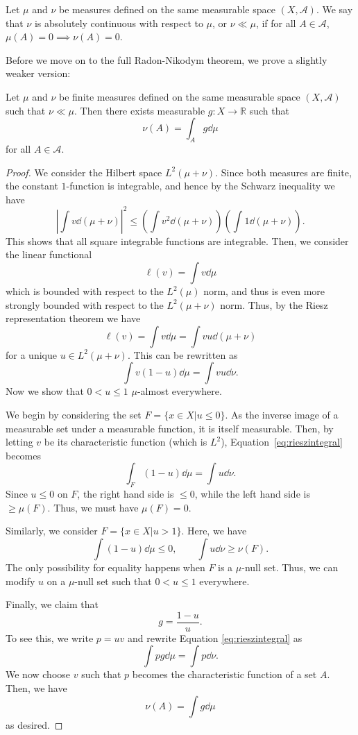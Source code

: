 \documentclass[twoside,symmetric, openany, 12pt]{./tuftebook}
\theoremstyle{definition}
\theoremstyle{definition}
\theoremstyle{definition}
\newcommand{\R}{\mathbb{R}}
\begin{document}
\begin{Definition}
	Let $\mu$ and $\nu$ be measures defined on the same measurable space $(X, \mathcal{A})$. We say that $\nu$ is absolutely continuous with respect to $\mu$, or $\nu \ll \mu$, if for all $A\in \mathcal{A}$, $\mu(A)=0\implies \nu(A)=0$.
\end{Definition}

Before we move on to the full Radon-Nikodym theorem, we prove a slightly weaker version:
\begin{Theorem}
	Let $\mu$ and $\nu$ be finite measures defined on the same measurable space $(X, \mathcal{A})$ such that $\nu \ll \mu$. Then there exists measurable $g:X \to \R$ such that
	\[\nu(A) = \int_A g \dd{\mu}\]
	for all $A\in \mathcal{A}$.
\end{Theorem}
\begin{proof}
	We consider the Hilbert space $L^2(\mu+\nu)$. Since both measures are finite, the constant $1$-function is integrable, and hence by the Schwarz inequality we have
	\[\left|\int v \dd{(\mu+\nu)}\right|^2 \le \left(\int v^2 \dd{(\mu+\nu)}\right) \left(\int 1\dd{(\mu+\nu)}\right).\]
	This shows that all square integrable functions are integrable. Then, we consider the linear functional
	\[\ell(v) = \int v \dd{\mu}\]
	which is bounded with respect to the $L^2(\mu)$ norm, and thus is even more strongly bounded with respect to the $L^2(\mu+\nu)$ norm. Thus, by the Riesz representation theorem we have
	\[\ell(v) = \int v\dd{\mu} = \int vu \dd{(\mu+\nu)}\]
	for a unique $u\in L^2(\mu+\nu)$. This can be rewritten as
	\begin{equation}\label{eq:rieszintegral}
		\int v(1-u)\dd{\mu}=\int vu \dd{\nu}.
		\end{equation}
	Now we show that $0 < u \le 1$ $\mu$-almost everywhere.
	
	We begin by considering the set $F = \{x\in X|u \le 0\}$. As the inverse image of a measurable set under a measurable function, it is itself measurable. Then, by letting $v$ be its characteristic function (which is $L^2$), Equation~\eqref{eq:rieszintegral} becomes
	\[\int_F (1-u)\dd{\mu} = \int u \dd{\nu}.\]
	Since $u\le 0$ on $F$, the right hand side is $\le 0$, while the left hand side is $\ge \mu(F)$. Thus, we must have $\mu(F)=0$.
	
	Similarly, we consider $F=\{x \in X|u > 1\}$. Here, we have
	\[\int (1-u)\dd{\mu} \le 0, \qquad \int u \dd{\nu} \ge \nu(F).\]
	The only possibility for equality happens when $F$ is a $\mu$-null set. Thus, we can modify $u$ on a $\mu$-null set such that $0< u \le 1$ everywhere.
	
	Finally, we claim that
	\[g = \frac{1-u}{u}.\]
	To see this, we write $p = uv$ and rewrite Equation \eqref{eq:rieszintegral} as
	\[\int pg \dd{\mu} = \int p \dd{\nu}.\]
	We now choose $v$ such that $p$ becomes the characteristic function of a set $A$. Then, we have
	\[\nu(A) = \int g \dd{\mu}\]
	as desired.
\end{proof}
\end{document}
